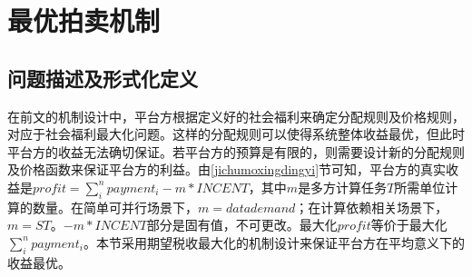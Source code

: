 \documentclass[promaster]{thesis-uestc}
\begin{document}
%

%




%





\section{最优拍卖机制}

\subsection{问题描述及形式化定义}
在前文的机制设计中，平台方根据定义好的社会福利来确定分配规则及价格规则，对应于社会福利最大化问题。这样的分配规则可以使得系统整体收益最优，但此时平台方的收益无法确切保证。若平台方的预算是有限的，则需要设计新的分配规则及价格函数来保证平台方的利益。由\ref{jichumoxingdingyi}节可知，平台方的真实收益是$profit = \sum_{i}^{n}{payment_i}-m*INCENT$，其中$m$是多方计算任务$T$所需单位计算的数量。在简单可并行场景下，$m=datademand$；在计算依赖相关场景下，$m=ST$。$-m*INCENT$部分是固有值，不可更改。最大化$profit$等价于最大化$\sum_{i}^{n}{payment_i}$。本节采用期望税收最大化的机制设计来保证平台方在平均意义下的收益最优。
\end{document}
